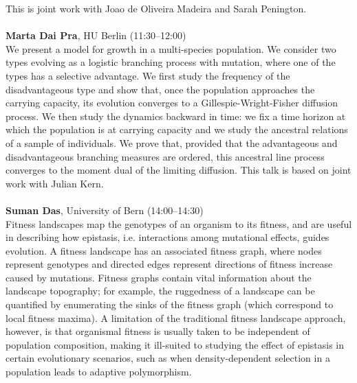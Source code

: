 \documentclass[12pt,a4paper]{article}
\begin{document}
 This is joint work with Joao de Oliveira Madeira and Sarah Penington. \\
\\[1ex]{ \large \textbf{ Marta Dai Pra}}, HU Berlin (11:30--12:00) \\[2ex] We present a model for growth in a multi-species population. We consider two types evolving as a logistic branching process with mutation, where one of the types has a selective advantage. We first study the frequency of the disadvantageous type and show that, once the population approaches the carrying capacity, its evolution converges to a Gillespie-Wright-Fisher diffusion process. We then study the dynamics backward in time: we fix a time horizon at which the population is at carrying capacity and we study the ancestral relations of a sample of individuals. We prove that, provided that the advantageous and disadvantageous branching measures are ordered, this ancestral line process converges to the moment dual of the limiting diffusion. This talk is based on joint work with Julian Kern. \\
\\[1ex]{ \large \textbf{ Suman Das}}, University of Bern (14:00--14:30) \\[2ex] Fitness landscapes map the genotypes of an organism to its fitness, and are useful in describing how epistasis, i.e. interactions among mutational effects, guides evolution. A fitness landscape has an associated fitness graph, where nodes represent genotypes and directed edges represent directions of fitness increase caused by mutations. Fitness graphs contain vital information about the landscape topography; for example, the ruggedness of a landscape can be quantified by enumerating the sinks of the fitness graph (which correspond to local fitness maxima). A limitation of the traditional fitness landscape approach, however, is that organismal fitness is usually taken to be independent of population composition, making it ill-suited to studying the effect of epistasis in certain evolutionary scenarios, such as when density-dependent selection in a population leads to adaptive polymorphism.  
\end{document}
